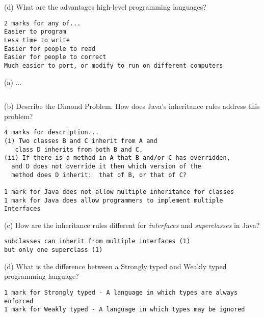 \documentclass{exam}
\begin{document}
\begin{question}
\item[(d)]
What are the advantages high-level programming languages?
\color{red}
\begin{lstlisting}
2 marks for any of...
Easier to program
Less time to write
Easier for people to read
Easier for people to correct
Much easier to port, or modify to run on different computers
\end{lstlisting}
\color{black}

\end{question}
\clearpage

\begin{question}
\item[(a)]
...
\color{red}
\begin{lstlisting}

\end{lstlisting}
\color{black}

\item[(b)]
Describe the Dimond Problem.  How does Java's inheritance rules address this problem? 
\color{red}
\begin{lstlisting}
4 marks for description...
(i) Two classes B and C inherit from A and 
   class D inherits from both B and C.
(ii) If there is a method in A that B and/or C has overridden, 
  and D does not override it then which version of the 
  method does D inherit:  that of B, or that of C?

1 mark for Java does not allow multiple inheritance for classes 
1 mark for Java does allow programmers to implement multiple Interfaces
\end{lstlisting}
\color{black}

\item[(c)]
How are the inheritance rules different for {\em interfaces} and {\em superclasses} in Java? 
\color{red}
\begin{lstlisting}
subclasses can inherit from multiple interfaces (1)
but only one superclass (1)
\end{lstlisting}
\color{black}

\item[(d)]
What is the difference between a Strongly typed and Weakly typed programming language?
\color{red}
\begin{lstlisting}
1 mark for Strongly typed - A language in which types are always enforced
1 mark for Weakly typed - A language in which types may be ignored
\end{lstlisting}
\color{black}
\end{question}
\clearpage
\end{document}
